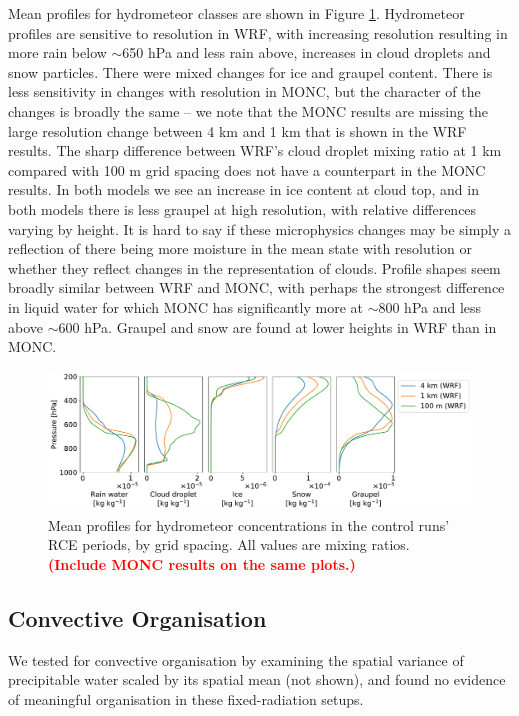 \documentclass[draft]{agujournal2019}
\newcommand{\todo}[1]{\textcolor{red}{\textbf{(#1)}}}
\begin{document}
Mean profiles for hydrometeor classes are shown in Figure
\ref{fig:rce_hydrometeors}. Hydrometeor profiles are sensitive to resolution in
WRF, with increasing resolution resulting in more rain below $\sim$650 hPa and
less rain above, increases in cloud droplets and snow particles. There were
mixed changes for ice and graupel content. There is less sensitivity in changes
with resolution in MONC, but the character of the changes is broadly the same --
we note that the MONC results are missing the large resolution change between 4
km and 1 km that is shown in the WRF results. The sharp difference between WRF's
cloud droplet mixing ratio at 1 km compared with 100 m grid spacing does not
have a counterpart in the MONC results. In both models we see an increase in ice
content at cloud top, and in both models there is less graupel at high
resolution, with relative differences varying by height. It is hard to say if
these microphysics changes may be simply a reflection of there being more
moisture in the mean state with resolution or whether they reflect changes in
the representation of clouds. Profile shapes seem broadly similar between WRF
and MONC, with perhaps the strongest difference in liquid water for which MONC
has significantly more at $\sim$800 hPa and less above $\sim$600 hPa. Graupel
and snow are found at lower heights in WRF than in MONC.

\begin{figure}[pth]
    \noindent\includegraphics[width=\textwidth]{figures/RCE_hydrometeors}
    \caption{Mean profiles for hydrometeor concentrations in the control runs'
    RCE periods, by grid spacing. All values are mixing ratios.
    \todo{Include MONC results on the same plots.}}
    \label{fig:rce_hydrometeors}
\end{figure}

\subsection{Convective Organisation}

We tested for convective organisation by examining the spatial variance of
precipitable water scaled by its spatial mean (not shown), and found no evidence
of meaningful organisation in these fixed-radiation setups.
\end{document}
